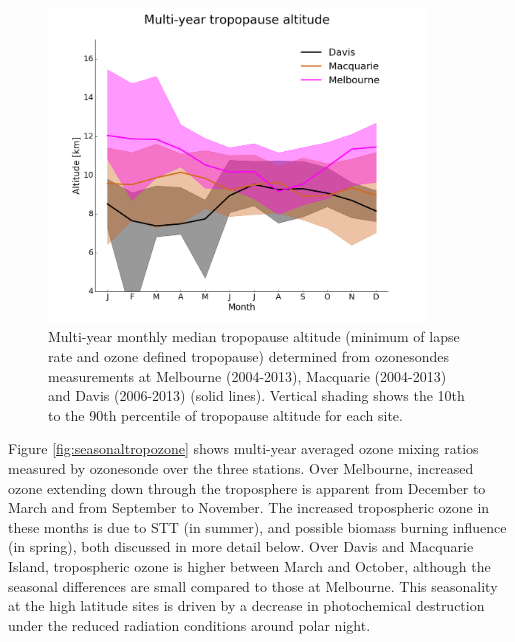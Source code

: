\documentclass[acp, manuscript]{copernicus} %
\begin{document}
    \begin{figure}[t] 
      \includegraphics[width=10cm]{figures/tpheights.png}
      \caption{%
	Multi-year monthly median tropopause altitude (minimum of lapse rate and ozone defined tropopause) determined from ozonesondes measurements at Melbourne (2004-2013), Macquarie (2004-2013) and Davis (2006-2013) (solid lines).
	Vertical shading shows the 10th to the 90th percentile of tropopause altitude for each site.}
      \label{fig:seasonaltpheights}
    \end{figure}

    Figure \ref{fig:seasonaltropozone} shows multi-year averaged ozone mixing ratios measured by ozonesonde over the three stations.
    Over Melbourne, increased ozone extending down through the troposphere is apparent from December to March and from September to November.
    The increased tropospheric ozone in these months is due to STT (in summer), and possible biomass burning influence (in spring), both discussed in more detail below.
    Over Davis and Macquarie Island, tropospheric ozone is higher between March and October, although the seasonal differences are small compared to those at Melbourne.
    This seasonality at the high latitude sites is driven by a decrease in photochemical destruction under the reduced radiation conditions around polar night. %
\end{document}

